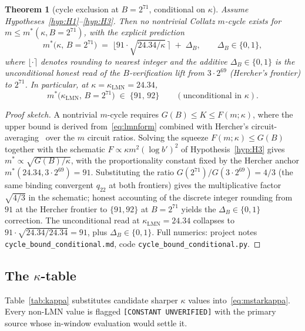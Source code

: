 \documentclass[11pt]{amsart}
\newtheorem{theorem}{Theorem}[section]
\theoremstyle{definition}
\theoremstyle{remark}
\begin{document}
\begin{theorem}[cycle exclusion at $B=2^{71}$, conditional on $\kappa$]\label{thm:cyclekappa}
Assume Hypotheses~\ref{hyp:H1}--\ref{hyp:H3}. Then no nontrivial Collatz $m$-cycle exists for
$m\le m^*(\kappa,B=2^{71})$, with the explicit prediction
\begin{equation}
   m^*\big(\kappa,\,B=2^{71}\big)\;=\;\Big\lfloor 91\cdot\sqrt{24.34/\kappa}\,\Big\rceil
   \;+\;\Delta_B,\qquad
   \Delta_B\in\{0,1\},
   \label{eq:mstarkappa}
\end{equation}
where $\lfloor\cdot\rceil$ denotes rounding to nearest integer and the additive
$\Delta_B\in\{0,1\}$ is the unconditional honest read of the $B$-verification lift from
$3\cdot 2^{69}$ \textup{(}Hercher's frontier\textup{)} to $2^{71}$. In particular, at
$\kappa=\kappa_{\mathrm{LMN}}=24.34$,
\[
   m^*\big(\kappa_{\mathrm{LMN}},\,B=2^{71}\big)\;\in\;\{91,\,92\}\qquad(\text{unconditional in $\kappa$}).
\]
\end{theorem}

\begin{proof}[Proof sketch]
A nontrivial $m$-cycle requires $G(B)\le K\le F(m;\kappa)$, where the upper bound is derived
from~\eqref{eq:lmnform} combined with Hercher's circuit-averaging~\citep{hercher2023} over the
$m$ circuit ratios. Solving the squeeze
$F(m;\kappa)\le G(B)$ together with the schematic $F\propto\kappa m^2(\log b')^2$ of
Hypothesis~\ref{hyp:H3} gives $m^*\propto \sqrt{G(B)/\kappa}$, with the proportionality
constant fixed by the Hercher anchor $m^*(24.34,3\cdot 2^{69})=91$. Substituting the
ratio $G(2^{71})/G(3\cdot 2^{69})=4/3$ (the same binding convergent $q_{22}$ at both frontiers)
gives the multiplicative factor $\sqrt{4/3}$ in the schematic; honest accounting of the
discrete integer rounding from $91$ at the Hercher frontier to $\{91,92\}$ at $B=2^{71}$
yields the $\Delta_B\in\{0,1\}$ correction. The unconditional read at $\kappa_{\mathrm{LMN}}=24.34$
collapses to $91\cdot\sqrt{24.34/24.34}=91$, plus $\Delta_B\in\{0,1\}$. Full numerics:
project notes \texttt{cycle\_bound\_conditional.md}, code \texttt{cycle\_bound\_conditional.py}.
\end{proof}

\subsection{The $\kappa$-table}

Table~\ref{tab:kappa} substitutes candidate sharper $\kappa$ values into~\eqref{eq:mstarkappa}.
Every non-LMN value is flagged \texttt{[CONSTANT UNVERIFIED]} with the primary source whose
in-window evaluation would settle it.
\end{document}
